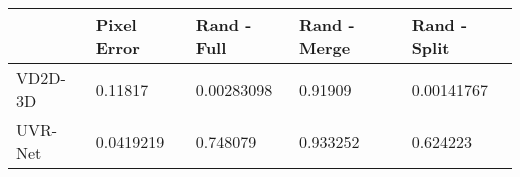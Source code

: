 \begin{tabular}{lllll}
\toprule
{} & Pixel Error & Rand - Full & Rand - Merge & Rand - Split \\
\midrule
VD2D-3D &     0.11817 &  0.00283098 &      0.91909 &   0.00141767 \\
UVR-Net &   0.0419219 &    0.748079 &     0.933252 &     0.624223 \\
\bottomrule
\end{tabular}
